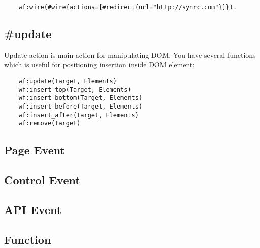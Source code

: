 \vspace{1\baselineskip}
\begin{lstlisting}
    wf:wire(#wire{actions=[#redirect{url="http://synrc.com"}]}).
\end{lstlisting}
\vspace{1\baselineskip}

\subsection{#update}
Update action is main action for manipulating DOM. You have several functions
which is useful for positioning insertion inside DOM element:

\vspace{1\baselineskip}
\begin{lstlisting}
    wf:update(Target, Elements)
    wf:insert_top(Target, Elements)
    wf:insert_bottom(Target, Elements)
    wf:insert_before(Target, Elements)
    wf:insert_after(Target, Elements)
    wf:remove(Target)
\end{lstlisting}
\vspace{1\baselineskip}

\subsection{Page Event}

\subsection{Control Event}

\subsection{API Event}

\subsection{Function}
